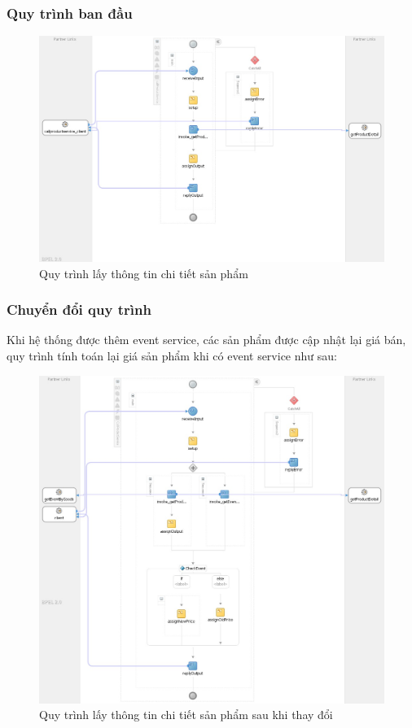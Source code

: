 \subsubsection*{Quy trình ban đầu}
\begin{figure}[!htp]
    \centering
    \includegraphics[width=12cm]{img/bpel/productDetail.jpg}
    \newline
    \caption{Quy trình lấy thông tin chi tiết sản phẩm}
\end{figure}

\subsubsection*{Chuyển đổi quy trình}
Khi hệ thống được thêm event service, các sản phẩm được cập nhật lại giá bán, quy trình tính toán lại giá sản phẩm khi có event service như sau:
\begin{figure}[!htp]
    \centering
    \includegraphics[width=14cm]{img/bpel/productDetailAfter.jpg}
    \newline
    \caption{Quy trình lấy thông tin chi tiết sản phẩm sau khi thay đổi}
\end{figure}

